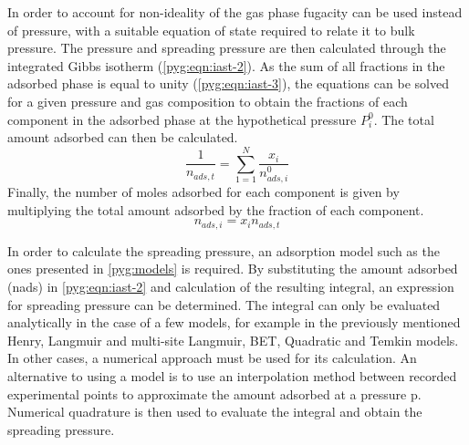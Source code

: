 In order to account for non-ideality of the gas phase
fugacity can be used instead of pressure,
with a suitable equation of state required to relate it to bulk pressure.
The pressure and spreading pressure are then calculated through
the integrated Gibbs isotherm (\autoref{pyg:eqn:iast-2}). As the sum of all
fractions in the adsorbed phase is equal to unity (\autoref{pyg:eqn:iast-3}),
the equations can be solved for a given pressure and gas composition to obtain
the fractions of each component in the adsorbed phase at the hypothetical
pressure \(P_{i}^{0}\). The total amount adsorbed can then be calculated.
%
\begin{equation}
	\frac{1}{n_{ads,t}} = \sum_{1=1}^{N} \frac{x_i}{n_{ads,i}^0}
\end{equation}
%
Finally, the number of moles adsorbed for each component is given
by multiplying the total amount adsorbed by the fraction of each
component.
%
\begin{equation}
	n_{ads, i} = x_i n_{ads,t}
\end{equation}

In order to calculate the spreading pressure, an adsorption model
such as the ones presented in \autoref{pyg:models} is required.
By substituting the amount adsorbed (\gls{nads}) in \autoref{pyg:eqn:iast-2}
and calculation of the resulting integral, an expression for
spreading pressure can be determined. The integral can only be
evaluated analytically in the case of a few models, for example in
the previously mentioned Henry, Langmuir and multi-site Langmuir,
\gls{BET}, Quadratic and Temkin models. In other cases, a numerical approach
must be used for its calculation. An alternative to using a
model is to use an interpolation method between recorded experimental
points to approximate the amount adsorbed at a pressure \gls{p}. Numerical
quadrature is then used to evaluate the integral and obtain the
spreading pressure.